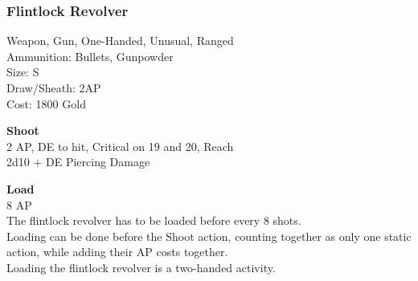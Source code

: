\subsubsection{Flintlock Revolver}\label{weapon:flintlockRevolver}
Weapon, Gun, One-Handed, Unusual, Ranged\\
Ammunition: Bullets, Gunpowder\\
Size: S\\
Draw/Sheath: 2AP\\
Cost: 1800 Gold

\textbf{Shoot} \\
2 AP, DE to hit, Critical on 19 and 20,  Reach\\
2d10 + DE Piercing Damage

\textbf{Load} \\
8 AP\\
The flintlock revolver has to be loaded before every 8 shots.\\
Loading can be done before the Shoot action, counting together as only one static action, while adding their AP costs together.\\
Loading the flintlock revolver is a two-handed activity.
